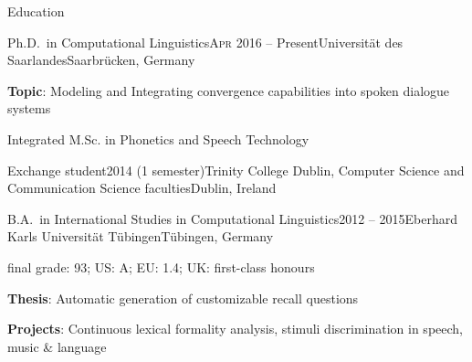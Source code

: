 \documentclass{resume} %
\begin{document}
\begin{rSection}{Education}

\begin{rSubsection}{Ph.D.\ in Computational Linguistics}{\textsc{Apr} 2016 -- Present}{Universität des Saarlandes}{Saarbrücken, Germany} %
	\setlength{\itemindent}{.7cm}
		
	\item \textbf{Topic}: Modeling and Integrating convergence capabilities into spoken dialogue systems %
	
	\item Integrated M.Sc. in Phonetics and Speech Technology
\end{rSubsection}

\begin{rSubsection}{Exchange student}{2014 (1 semester)}{Trinity College Dublin, Computer Science and Communication Science faculties}{Dublin, Ireland}
	\setlength{\itemindent}{.7cm}
	\item[]
	
\end{rSubsection}

\begin{rSubsection}{B.A.\ in International Studies in Computational Linguistics}{2012 -- 2015}{Eberhard Karls Universität Tübingen}{Tübingen, Germany}
	
\vspace*{-.2cm}
\item[]{final grade: 93; {\footnotesize US: A; EU: 1.4; UK: first-class honours}}
\vspace*{.2cm}

	\setlength{\itemindent}{.7cm}
	
	\item \textbf{Thesis}: Automatic generation of customizable recall questions
	
	\item \textbf{Projects}: Continuous lexical formality analysis, stimuli discrimination in speech, music \& language
	
\end{rSubsection}

\end{rSection}
\end{document}
